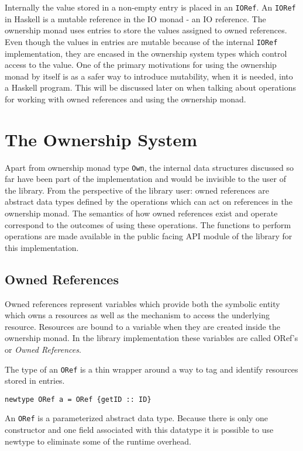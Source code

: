 \documentclass[onehalf,11pt]{beavtex}
\begin{document}
Internally the value stored in a non-empty entry is placed in an \texttt{IORef}.
An \texttt{IORef} in Haskell is a mutable reference in the IO monad - an IO
reference.
The ownership monad uses entries to store the values assigned to owned
references.
Even though the values in entries are mutable because of the internal \texttt{IORef}
implementation, they are encased in the ownership system types which control
access to the value.
One of the primary motivations for using the ownership monad by itself is as a
safer way to introduce mutability, when it is needed, into a Haskell program.
This will be discussed later on when talking about operations for working with
owned references and using the ownership monad.


\section{The Ownership System}

Apart from ownership monad type \texttt{Own}, the internal data structures
discussed so far have been part of the implementation and would be invisible to
the user of the library.
From the perspective of the library user: owned references are abstract
data types defined by the operations which can act on references in the
ownership monad.
The semantics of how owned references exist and operate correspond to the
outcomes of using these operations.
The functions to perform operations are made available in the public facing API
module of the library for this implementation.

\subsection{Owned References}

Owned references represent variables which provide both the symbolic entity
which owns a resources as well as the mechanism to access the underlying resource.
Resources are bound to a variable when they are created inside the ownership
monad. In the library implementation these variables are called ORef's or
\textit{Owned References}.

The type of an \texttt{ORef} is a thin wrapper around a way to tag and identify
resources stored in entries.

\begin{verbatim}
newtype ORef a = ORef {getID :: ID}
\end{verbatim}

An \texttt{ORef} is a parameterized abstract data type. Because there is only
one constructor and one field associated with this datatype it is possible to
use newtype to eliminate some of the runtime overhead.
\end{document}
